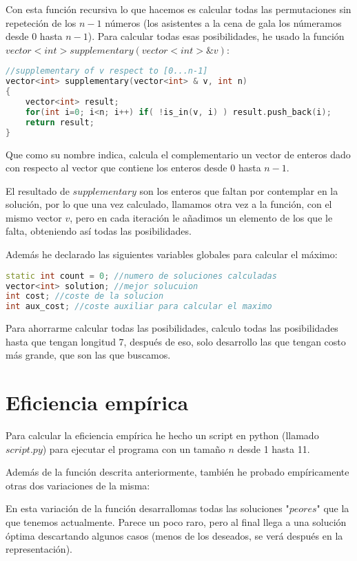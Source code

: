 \documentclass[11pt]{article}
\begin{document}
Con esta función recursiva lo que hacemos es calcular todas las permutaciones sin repeteción de los $n-1$ números (los asistentes a la cena de gala los númeramos desde $0$ hasta $n-1$). Para calcular todas esas posibilidades, he usado la función $vector<int> supplementary(vector<int> \& v)$:

\begin{lstlisting}[language=C++, caption=función auxiliar]
//supplementary of v respect to [0...n-1]
vector<int> supplementary(vector<int> & v, int n)
{
	vector<int> result;
	for(int i=0; i<n; i++) if( !is_in(v, i) ) result.push_back(i);
	return result;
}
\end{lstlisting}

Que como su nombre indica, calcula el complementario un vector de enteros dado con respecto al vector que contiene los enteros desde $0$ hasta $n-1$.

El resultado de $supplementary$ son los enteros que faltan por contemplar en la solución, por lo que una vez calculado, llamamos otra vez a la función, con el mismo vector $v$, pero en cada iteración le añadimos un elemento de los que le falta, obteniendo así todas las posibilidades.

Además he declarado las siguientes variables globales para calcular el máximo:

\begin{lstlisting}[language=C++, caption=Variables globales]
static int count = 0; //numero de soluciones calculadas
vector<int> solution; //mejor solucuion
int cost; //coste de la solucion
int aux_cost; //coste auxiliar para calcular el maximo
\end{lstlisting}

Para ahorrarme calcular todas las posibilidades, calculo todas las posibilidades hasta que tengan longitud 7, después de eso, solo desarrollo las que tengan costo más grande, que son las que buscamos.

\section{Eficiencia empírica}

Para calcular la eficiencia empírica he hecho un script en python (llamado $script.py$) para ejecutar el programa con un tamaño $n$ desde 1 hasta 11.

Además de la función descrita anteriormente, también he probado empíricamente otras dos variaciones de la misma:

En esta variación de la función desarrallomas todas las soluciones "$peores$" que la que tenemos actualmente. Parece un poco raro, pero al final llega a una solución óptima descartando algunos casos (menos de los deseados, se verá después en la representación).
\end{document}
